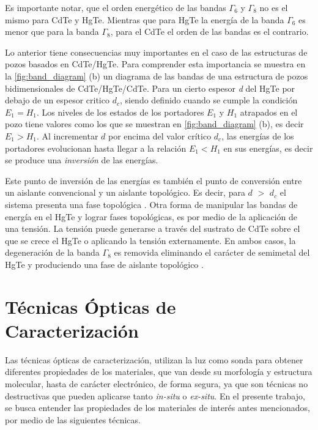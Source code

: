 Es importante notar, que el orden energético de las bandas  $ \Gamma_{6} $ y $ \Gamma_{8} $ no es el mismo para CdTe y HgTe. Mientras que para HgTe la energía de la banda $ \Gamma_{6} $  es menor que para la banda  $ \Gamma_{8} $, para el CdTe el orden de las bandas es el contrario.

Lo anterior tiene consecuencias muy importantes en el caso de las estructuras de pozos basados en CdTe/HgTe. Para comprender esta importancia se muestra en la \ref{fig:band_diagram} (b) un diagrama de las bandas de una estructura de pozos bidimensionales de CdTe/HgTe/CdTe\cite{Bernevig2006}.
Para un cierto espesor \textit{d} del HgTe por debajo de un espesor critico $ d_{c} $, siendo definido cuando se cumple la condición $ E_{1} = H_{1} $. Los niveles de los estados de los portadores $ E_{1} $ y $ H_{1} $ atrapados en el pozo tiene valores como los que se muestran en \ref{fig:band_diagram} (b), es decir $ E_{1}>H_{1} $. 
Al incrementar $d$ por encima del valor crítico $ d_{c} $, las energías de los portadores evolucionan hasta llegar a la relación $ E_{1}<H_{1} $ en sus energías, es decir se produce una \textit{inversión} de las energías.

Este punto de inversión de las energías es también el punto de conversión entre un aislante convencional y un aislante topológico. Es decir, para $ d $ $ > $ $ d_{c} $ el sistema presenta una fase topológica \cite{Bernevig2006}.
Otra forma de manipular las bandas de energía en el HgTe y lograr fases topológicas, es por medio de la aplicación de una tensión. La tensión puede generarse a través del sustrato de CdTe sobre el que se crece el HgTe o aplicando la tensión externamente. En ambos casos, la degeneración de la banda $ \Gamma_{8} $ es removida eliminando el carácter de semimetal del HgTe y produciendo una fase de aislante topológico \cite{Brne2011, Wu2014}. 

\section{Técnicas Ópticas de Caracterización}
\label{ch1-opt-charac-tech}
Las técnicas ópticas de caracterización, utilizan la luz como sonda para obtener diferentes propiedades de los materiales, que van desde su morfología y estructura molecular, hasta de carácter electrónico, de forma segura, ya que son técnicas no destructivas que pueden aplicarse tanto \textit{in-situ} o \textit{ex-situ}. En el presente trabajo, se busca entender las propiedades de los materiales de interés antes mencionados, por medio de las siguientes técnicas.

